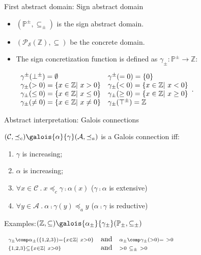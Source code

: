 \begin{frame}{First abstract domain: Sign abstract domain}
\begin{itemize}
	\item $(\mathbb{P}^\pm, \subseteq_\pm)$ is the sign abstract domain.
	\item $(\mathcal{P_S}(\mathbb{Z}),\subseteq)$ be the concrete domain.
	\item The sign concretization function is defined as $\gamma_\pm:  \mathbb{P}^{\pm} \rightarrow \mathbb{Z}$:
	
	$    \begin{array}{l l}
\gamma^{\pm}(\bot^{\pm}) = \emptyset &  \gamma^{\pm}(=0)=\{0\} \\ 
\gamma_\pm(>0)=\{x \in \mathbb{Z} |~ x >0\}	 & \gamma_\pm(<0)=\{x \in \mathbb{Z} |~ x <0\} \\
\gamma_\pm(\leq0)=\{x \in \mathbb{Z} |~ x \leq 0\}	 & \gamma_\pm(\geq 0)=\{x \in \mathbb{Z} |~ x \geq 0\} \\
\gamma_\pm(\neq 0)=\{x \in \mathbb{Z} |~ x \neq 0\}	 & \gamma_\pm(\top^{\pm})=\mathbb{Z} \\
\end{array}.$
\end{itemize}
\end{frame}

\begin{frame}{Abstract interpretation: Galois connections}
\begin{definition}
 $(\mathcal{C}, \preceq_c) \galois{\alpha}{\gamma} (\mathcal{A}, \preceq_a)$ is a Galois connection iff:
 \begin{enumerate}
 \item $\gamma$ is increasing;
 \item $\alpha$ is increasing;
 \item $\forall x \in \mathcal{C}~. ~x \preceq_c \gamma \comp \alpha(x)$ ($\gamma \comp \alpha$ is extensive)
 \item $\forall y \in \mathcal{A}~.~ \alpha \comp \gamma(y) \preceq_a y$ ($\alpha \comp \gamma$ is reductive)
 \end{enumerate}
\end{definition}

\begin{exampleblock}{Examples:$(\mathbb{Z}, \subseteq) \galois{\alpha_\pm}{\gamma_\pm} (\mathbb{P}_{\pm}, \subseteq_{\pm})$}
	
	$\begin{array}{l l l}
	\scriptstyle \gamma_\pm\comp \alpha_\pm (\{1,2,3\})= \{x \in \mathbb{Z} |~ x >0\} & \text{and} &\scriptstyle\alpha_\pm\comp \gamma_\pm(>0) =~>0  \\
	\scriptstyle \{1,2,3\} \subseteq  \{x \in \mathbb{Z} |~ x >0\} & \text{and}  & \scriptstyle>0 ~\subseteq_\pm~ >0
	\end{array}$
\end{exampleblock}
\end{frame}
	

